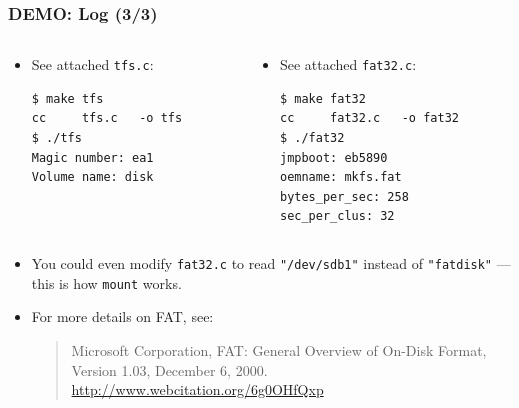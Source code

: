 \begin{frame}[fragile]

\frametitle{DEMO: Log (3/3)}

\begin{columns}[T]

\begin{column}[T]{.45\textwidth}

\begin{itemize}

\item See attached \texttt{tfs.c}:

\begin{verbatim}
$ make tfs
cc     tfs.c   -o tfs
$ ./tfs 
Magic number: ea1
Volume name: disk
\end{verbatim}

\end{itemize}

\end{column}

\begin{column}[T]{.55\textwidth}

\begin{itemize}

\item See attached \texttt{fat32.c}:

\begin{verbatim}
$ make fat32
cc     fat32.c   -o fat32
$ ./fat32
jmpboot: eb5890
oemname: mkfs.fat
bytes_per_sec: 258
sec_per_clus: 32 
\end{verbatim}

\end{itemize}

\end{column}

\end{columns}

\vspace{\fill}

\begin{itemize}

\item You could even modify \texttt{fat32.c} to read \texttt{"/dev/sdb1"}
instead of \texttt{"fatdisk"} --- this is how \texttt{mount} works.

\item For more details on FAT, see:

\begin{quote}

\footnotesize Microsoft Corporation, FAT: General Overview of On-Disk Format,
Version 1.03, December 6, 2000. \url{http://www.webcitation.org/6g0OHfQxp}

\end{quote}

\end{itemize}

\end{frame}
